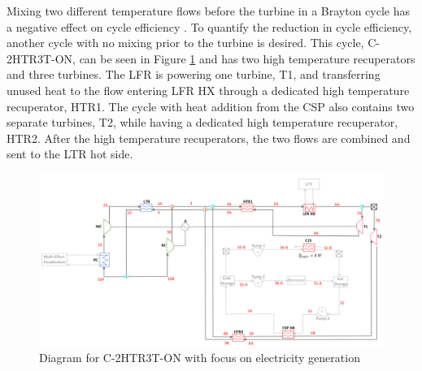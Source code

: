 \begin{paracol}{2}
Mixing two different temperature flows before the turbine in a Brayton cycle has a negative effect on cycle efficiency . To quantify the reduction in cycle efficiency, another cycle with no mixing prior to the turbine is desired. This cycle, C-2HTR3T-ON, can be seen in Figure \ref{c-2htr3t-on} and has two high temperature recuperators and three turbines. The LFR is powering one turbine, T1, and transferring unused heat to the flow entering LFR HX through a dedicated high temperature recuperator, HTR1. 
The cycle with heat addition from the CSP also contains two separate turbines, T2, while having a dedicated high temperature recuperator, HTR2. 
After the high temperature recuperators, the two flows are combined and sent to the LTR hot side. 

\end{paracol}
\begin{figure}[H]
    \widefigure
    \includegraphics[width=\linewidth]{Definitions/c-2htr3t-on.pdf}
    \caption{Diagram for C-2HTR3T-ON with focus on electricity generation\label{c-2htr3t-on}}
\end{figure}
